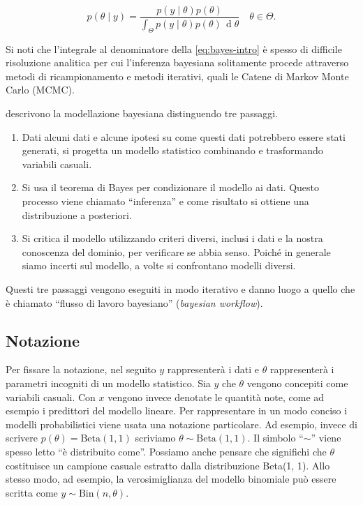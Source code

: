 \documentclass[
]{book}
\providecommand{\tightlist}{%
  \setlength{\itemsep}{0pt}\setlength{\parskip}{0pt}}
\theoremstyle{definition}
\theoremstyle{definition}
\theoremstyle{definition}
\theoremstyle{definition}
\theoremstyle{remark}
\begin{document}
\begin{equation}
p(\theta \mid y) = \frac{p(y \mid \theta) p(\theta)}{\int_{\Theta}p(y \mid \theta) p(\theta) \,\operatorname {d}\!\theta} \quad \theta \in \Theta.
\label{eq:bayes-intro}
\end{equation}

Si noti che l'integrale al denominatore della \eqref{eq:bayes-intro} è spesso di difficile risoluzione analitica per cui l'inferenza bayesiana solitamente procede attraverso metodi di ricampionamento e metodi iterativi, quali le Catene di Markov Monte Carlo (MCMC).

\citet{martin2022bayesian} descrivono la modellazione bayesiana distinguendo tre passaggi.

\begin{enumerate}
\def\labelenumi{\arabic{enumi}.}
\tightlist
\item
  Dati alcuni dati e alcune ipotesi su come questi dati potrebbero essere stati generati, si progetta un modello statistico combinando e trasformando variabili casuali.
\item
  Si usa il teorema di Bayes per condizionare il modello ai dati. Questo processo viene chiamato ``inferenza'' e come risultato si ottiene una distribuzione a posteriori.
\item
  Si critica il modello utilizzando criteri diversi, inclusi i dati e la nostra conoscenza del dominio, per verificare se abbia senso. Poiché in generale siamo incerti sul modello, a volte si confrontano modelli diversi.
\end{enumerate}

Questi tre passaggi vengono eseguiti in modo iterativo e danno luogo a quello che è chiamato ``flusso di lavoro bayesiano'' (\emph{bayesian workflow}).

\hypertarget{notazione}{%
\subsection{Notazione}\label{notazione}}

Per fissare la notazione, nel seguito \(y\) rappresenterà i dati e \(\theta\) rappresenterà i parametri incogniti di un modello statistico. Sia \(y\) che \(\theta\) vengono concepiti come variabili casuali. Con \(x\) vengono invece denotate le quantità note, come ad esempio i predittori del modello lineare. Per rappresentare in un modo conciso i modelli probabilistici viene usata una notazione particolare. Ad esempio, invece di scrivere \(p(\theta) = \mbox{Beta}(1, 1)\) scriviamo \(\theta \sim \mbox{Beta}(1, 1)\). Il simbolo ``\(\sim\)'' viene spesso letto ``è distribuito come''. Possiamo anche pensare che significhi che \(\theta\) costituisce un campione casuale estratto dalla distribuzione Beta(1, 1). Allo stesso modo, ad esempio, la verosimiglianza del modello binomiale può essere scritta come \(y \sim \text{Bin}(n, \theta)\).
\end{document}
